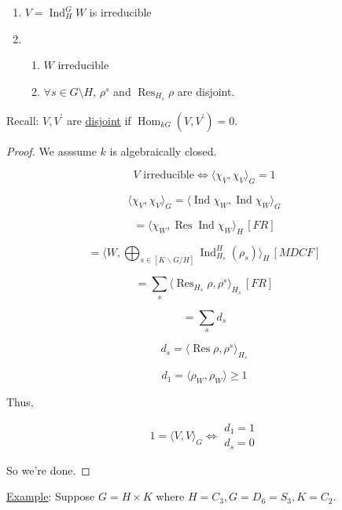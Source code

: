 \documentclass{article}
\theoremstyle{definition}
\begin{document}
\begin{enumerate}[label=\arabic*)]
    \item \(V = \operatorname{Ind} ^G _H W\) is irreducible 
    \item 
        \begin{enumerate}[label=\alph*)]
            \item \(W\) irreducible
            \item \(\forall s \in G \setminus H\), \(\rho^s\) and \(\operatorname{R es}_{H_s}\rho \) are disjoint. 
        \end{enumerate} 
\end{enumerate} 

Recall: \(V, V^{\prime}\) are \underline{disjoint} if \(\operatorname{Hom}_{kG}(V,V^{\prime}) = 0\).

\begin{proof}
    We asssume \(k\) is algebraically closed.

    \[
        V \text{ irreducible} \iff \langle \chi_V, \chi_V \rangle _ G = 1
    \]

    \[
        \langle \chi_V, \chi_V \rangle _G = \langle \operatorname{Ind} \chi_W, \operatorname{Ind} \chi_W \rangle _ G
    \]

    \[
        = \langle \chi_W, \operatorname{R es} \operatorname{Ind} \chi_W \rangle _H \, [FR]
    \]

    \[
        = \langle W, \bigoplus_{s\in [K \backslash G / H]} \operatorname{Ind} ^H _{H_s} (\rho_s)  \rangle_H \, [MDCF] 
    \]

    \[
        = \sum_{s} \langle \operatorname{R es}_{H_s} \rho, \rho^s  \rangle _{H_s} \, [FR] 
    \]

    \[
        = \sum_{s} d_s
    \]

    \[
        d_s = \langle \operatorname{R es} \rho , \rho^s  \rangle _{H_s}
    \]

    \[
        d_1 = \langle \rho_W, \rho_W \rangle \geq 1
    \]

    Thus,

    \[
        1 = \langle V, V \rangle _G \iff \begin{matrix}
             d_1 = 1 \\
             d_s = 0 
        \end{matrix}
    \]

    So we're done.

\end{proof}

\underline{Example}: Suppose \(G = H \times K\) where \(H = C_3, G = D_6 = S_3, K = C_2\).
\end{document}
